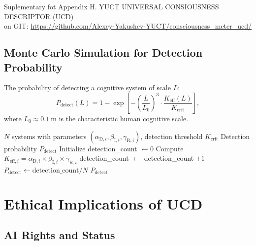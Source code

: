 \documentclass[12pt,a4paper]{article}
\newcommand{\eff}{\mathrm{eff}}
\newcommand{\Ke}{K_{\eff}}
\newcommand{\Kcrit}{K_{\mathrm{crit}}}
\begin{document}
	Suplementary fot Appendix H. YUCT UNIVERSAL CONSIOUSNESS DESCRIPTOR (UCD) \\ on GIT: \url{https://github.com/Alexey-Yakushev-YUCT/consciousness_meter_ucd/}
	
	\subsection{Monte Carlo Simulation for Detection Probability}
	
	The probability of detecting a cognitive system of scale \(L\):
	\[
	P_{\mathrm{detect}}(L) = 1 - \exp\!\left[-\left(\frac{L}{L_0}\right)^3 \cdot \frac{\Ke(L)}{\Kcrit}\right],
	\]
	where \(L_0 \approx 0.1~\mathrm{m}\) is the characteristic human cognitive scale.
	
	\begin{algorithm}
		\caption{Monte Carlo Simulation of Cognitive System Detection}
		\begin{algorithmic}[1]
			\REQUIRE \(N\) systems with parameters \((\alpha_{\mathrm{D},i}, \beta_{\mathrm{I},i}, \gamma_{\mathrm{R},i})\), detection threshold \(\Kcrit\)
			\ENSURE Detection probability \(P_{\mathrm{detect}}\)
			\STATE Initialize detection\_count \(\gets 0\)
			\STATE Compute \(K_{\eff,i} = \alpha_{\mathrm{D},i} \times \beta_{\mathrm{I},i} \times \gamma_{\mathrm{R},i}\)
			\IF{\(K_{\eff,i} > \Kcrit\)}
			\STATE detection\_count \(\gets\) detection\_count \(+ 1\)
			\ENDIF
			\ENDFOR
			\STATE \(P_{\mathrm{detect}} \gets \text{detection\_count} / N\)
			\RETURN \(P_{\mathrm{detect}}\)
		\end{algorithmic}
	\end{algorithm}
	
	\section{Ethical Implications of UCD}
	
	\subsection{AI Rights and Status}
	
\end{document}
